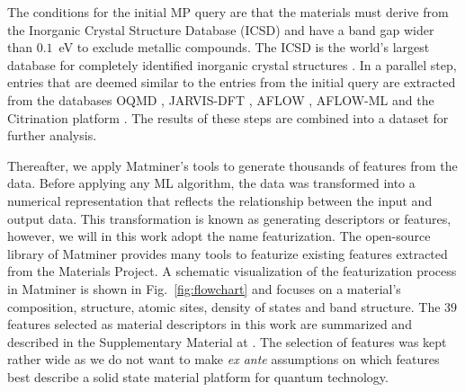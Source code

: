 \documentclass[superscriptaddress,unsortedaddress,
 amsmath,amssymb,
 aps,
]{revtex4-2}
\begin{document}
The conditions for the initial MP query are that the materials must derive from 
the Inorganic Crystal Structure Database (ICSD) and have a band gap wider than $0.1$~eV to exclude metallic compounds. The ICSD is the world's largest database for completely identified inorganic crystal structures \cite{Allen1987,Zagorac2019}. 
In a parallel step, entries that are deemed similar to the entries from the initial query are extracted from the databases OQMD \cite{Saal2013,Kirklin2015}, JARVIS-DFT \cite{Choudhary2020}, AFLOW \cite{Curtarolo2012, Curtarolo2012a, Calderon2015}, AFLOW-ML \cite{Isayev2017} and the Citrination platform \cite{OMaraJordan2016MDIA}. The results of these steps are combined into a dataset for further analysis. 

Thereafter, we apply Matminer’s \cite{Ward2018} tools to generate thousands of features from the data. 
Before applying any ML algorithm, the data was transformed into a numerical representation that reflects the relationship between the input and output data. This transformation is known as generating descriptors 
or features, however, we will in this work adopt the name featurization. 
The open-source library of Matminer provides many tools to featurize existing features extracted from the Materials Project. 
A schematic visualization of the featurization process in Matminer is shown in Fig.~\ref{fig:flowchart} 
and focuses on a material's composition,  structure, atomic sites, density of states and band structure. 
The $39$ features selected as material descriptors in this work are summarized and described in the Supplementary Material at \cite{supplementary}. The selection of features was kept rather wide as we do not want to make {\em ex ante} assumptions on which features best describe a solid state material platform for quantum technology. 
\end{document}
